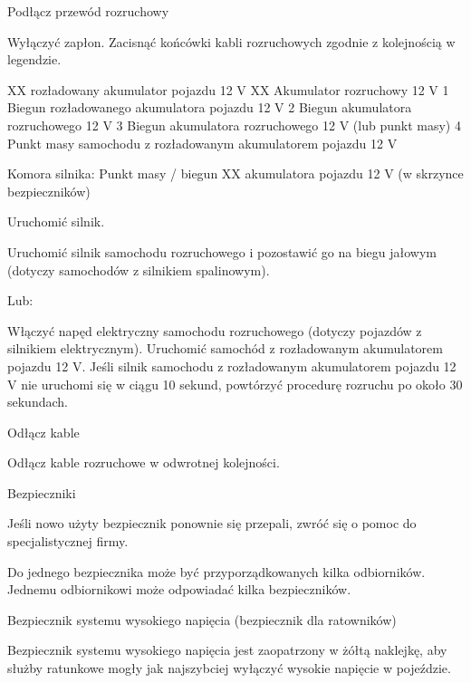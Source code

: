 Podłącz przewód rozruchowy
\begin{itemizeArrow}
	\itemArrow Wyłączyć zapłon.
	\itemArrow Zacisnąć końcówki kabli rozruchowych zgodnie z kolejnością w legendzie.
\end{itemizeArrow}
XX rozładowany akumulator pojazdu 12 V
XX Akumulator rozruchowy 12 V
1 Biegun rozładowanego akumulatora pojazdu 12 V
2 Biegun akumulatora rozruchowego 12 V
3 Biegun akumulatora rozruchowego 12 V (lub punkt masy)
4 Punkt masy samochodu z rozładowanym akumulatorem pojazdu 12 V


Komora silnika: Punkt masy / biegun XX akumulatora pojazdu 12 V (w skrzynce bezpieczników)

Uruchomić silnik.
\begin{itemizeArrow}
	\itemArrow Uruchomić silnik samochodu rozruchowego i pozostawić go na biegu jałowym (dotyczy samochodów z silnikiem spalinowym).
\end{itemizeArrow}
Lub:
\begin{itemizeArrow}
	\itemArrow Włączyć napęd elektryczny samochodu rozruchowego (dotyczy pojazdów z silnikiem elektrycznym).
	\itemArrow Uruchomić samochód z rozładowanym akumulatorem pojazdu 12 V.
	\itemArrow Jeśli silnik samochodu z rozładowanym akumulatorem pojazdu 12 V nie uruchomi się w ciągu 10 sekund, powtórzyć procedurę rozruchu po około 30 sekundach.
\end{itemizeArrow}

Odłącz kable

\begin{itemizeArrow}
	\itemArrow Odłącz kable rozruchowe w odwrotnej kolejności.
\end{itemizeArrow}

Bezpieczniki

\begin{itemizeTriangle}
	\itemTriangle Jeśli nowo użyty bezpiecznik ponownie się przepali, zwróć się o pomoc do specjalistycznej firmy.
\end{itemizeTriangle}

Do jednego bezpiecznika może być przyporządkowanych kilka odbiorników. Jednemu odbiornikowi może odpowiadać kilka bezpieczników.

Bezpiecznik systemu wysokiego napięcia (bezpiecznik dla ratowników)

Bezpiecznik systemu wysokiego napięcia jest zaopatrzony w żółtą naklejkę, aby służby ratunkowe mogły jak najszybciej wyłączyć wysokie napięcie w pojeździe.


